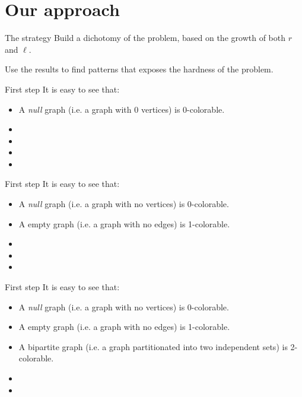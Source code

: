 \documentclass[9pt, compress]{beamer}
\newcommand{\?}{\textcolor{warn}{\textit{?}}}
\begin{document}
    \section{Our approach}
    \begin{frame}{The strategy}
      Build a dichotomy of the problem, based on the growth of both $r$ and $\ell$.
      
      Use the results to find patterns that exposes the hardness of the problem.
    \end{frame}
    \begin{frame}{First step}
      It is easy to see that:
      \begin{itemize}
        \item A \emph{null} graph (i.e. a graph with 0 vertices) is 0-colorable.
        \item 
        \item 
        \item 
         \item                                                                                                                
      \end{itemize}
    \end{frame}
    \begin{frame}{First step}
      It is easy to see that:
      \begin{itemize}
        \item A \emph{null} graph (i.e. a graph with no vertices) is 0-colorable.
        \item A empty graph (i.e. a graph with no edges) is 1-colorable.
        \item 
        \item 
         \item                                                                                                                
      \end{itemize}
    \end{frame}
    \begin{frame}{First step}
     It is easy to see that:
      \begin{itemize}
        \item A \emph{null} graph (i.e. a graph with no vertices) is 0-colorable.
        \item A empty graph (i.e. a graph with no edges) is 1-colorable.
        \item A bipartite graph (i.e. a graph partitionated into two independent sets) is 2-colorable.
        \item 
         \item                                                                                                                
      \end{itemize}
    \end{frame}
\end{document}
